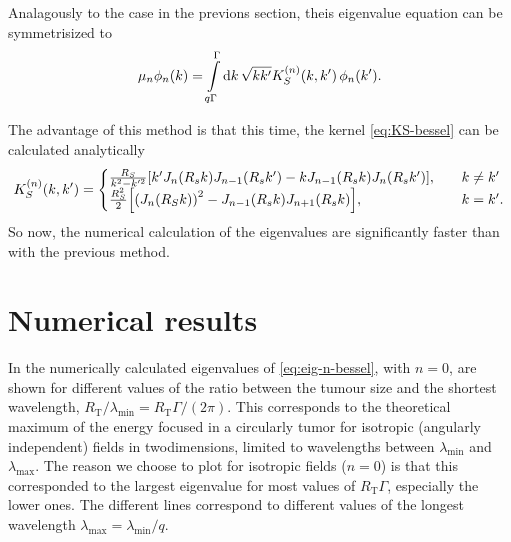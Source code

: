\documentclass[11pt,a4paper, 
swedish,english %
]{article}
\newcommand{\RT}{\ensuremath{R_{\text{T}}}}
\begin{document}
Analagously to the case in the previons section, theis eigenvalue
equation can be symmetrisized to
\begin{equation}\label{eq:eig-n-bessel}
\mu_n\phi_n(k) = \int_{q\Gamma}^{\Gamma}\rd{k}\,
\sqrt{kk'} K_S^{(n)}(k, k')\,\phi_n(k').
\end{equation}

The advantage of this method is that this time, the kernel
\eqref{eq:KS-bessel} can be calculated analytically
\cite[Formula 5.54]{Gradshteyn-Ryzhik}
\begin{equation}
K_S^{(n)}(k, k') =
\begin{cases}
\frac{R_S}{k^2-k'^2}
\qty[k'J_{n}(R_sk)J_{n-1}(R_sk')-kJ_{n-1}(R_sk)J_{n}(R_sk')]
\qc &k\neq k'\\
\frac{R_S^2}{2}\qty[ \qty(J_{n}(R_Sk))^2
-J_{n-1}(R_sk)J_{n+1}(R_sk)]
\qc &k= k'.
\end{cases}
\end{equation}
So now, the numerical calculation of the eigenvalues are significantly
faster than with the previous method.


\section{Numerical results}
In  the numerically calculated eigenvalues of \eqref{eq:eig-n-bessel}, with $n=0$, are shown for different values of the ratio between the tumour size and the shortest wavelength, $\RT/\lambda_{\min}=\RT\Gamma/(2\pi)$. This corresponds to the theoretical maximum of the energy focused in a circularly tumor for isotropic (angularly independent) fields in twodimensions, limited to wavelengths between $\lambda_{\min}$ and $\lambda_{\max}$.
The reason we choose to plot for isotropic fields ($n=0$) is that this corresponded to the largest eigenvalue for most values of $\RT\Gamma$, especially the lower ones.
The different lines correspond to different values of the longest wavelength $\lambda_{\max}=\lambda_{\min}/q$. 
\end{document}

